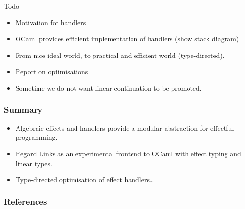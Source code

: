 \documentclass[10pt,compress]{beamer}
\begin{document}
\begin{frame}
\begin{figure}
\end{figure}
\end{frame}

\begin{frame}
  Todo
\begin{itemize}
  \item Motivation for handlers
  \item OCaml provides efficient implementation of handlers (show stack diagram)
  \item From nice ideal world, to practical and efficient world (type-directed).
  \item Report on optimisations
  \item Sometime we do not want linear continuation to be promoted.
\end{itemize}
\end{frame}

\begin{frame}
  \frametitle{Summary}
\begin{itemize}
\item Algebraic effects and handlers provide a modular abstraction for
  effectful programming.
\item Regard Links as an experimental frontend to OCaml with effect
  typing and linear types.
\item Type-directed optimisation of effect handlers\dots
\end{itemize}
\end{frame}

%


\begin{frame}[allowframebreaks]
  \frametitle{References}
  \nocite{*}
  
\end{frame}
\end{document}
